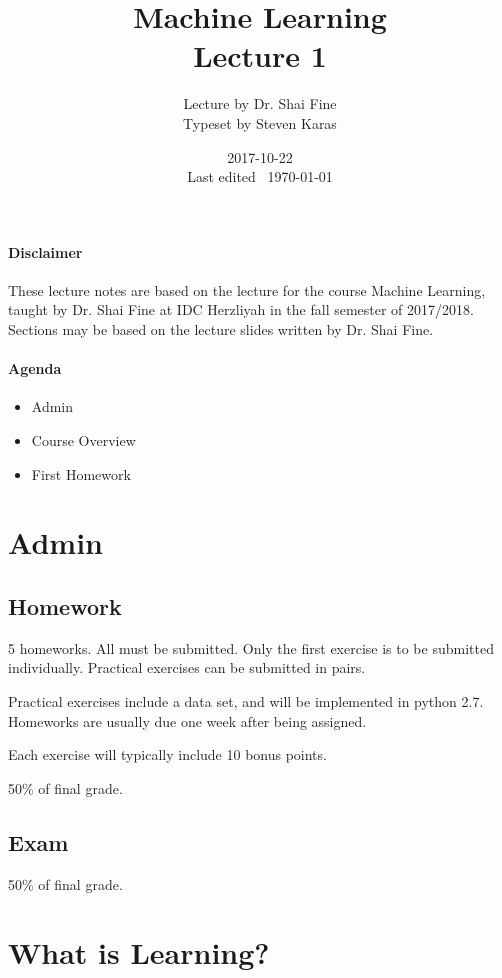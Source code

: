 \documentclass{idc_msc}
\title{Machine Learning\\\large Lecture 1}
\date{2017-10-22 \\ Last edited \currenttime\ \today}
\author{Lecture by Dr. Shai Fine\\Typeset by Steven Karas}
\begin{document}
\maketitle

\paragraph{Disclaimer}

These lecture notes are based on the lecture for the course Machine Learning, taught by Dr. Shai Fine at IDC Herzliyah in the fall semester of 2017/2018.
Sections may be based on the lecture slides written by Dr. Shai Fine.

\paragraph{Agenda}

\begin{itemize}
  \item Admin
  \item Course Overview
  \item First Homework
\end{itemize}

\section{Admin}

\subsection{Homework}

5 homeworks. All must be submitted.
Only the first exercise is to be submitted individually.
Practical exercises can be submitted in pairs.

Practical exercises include a data set, and will be implemented in python 2.7.
Homeworks are usually due one week after being assigned.

Each exercise will typically include 10 bonus points.

50\% of final grade.

\subsection{Exam}

50\% of final grade.

\section{What is Learning?}
\end{document}
